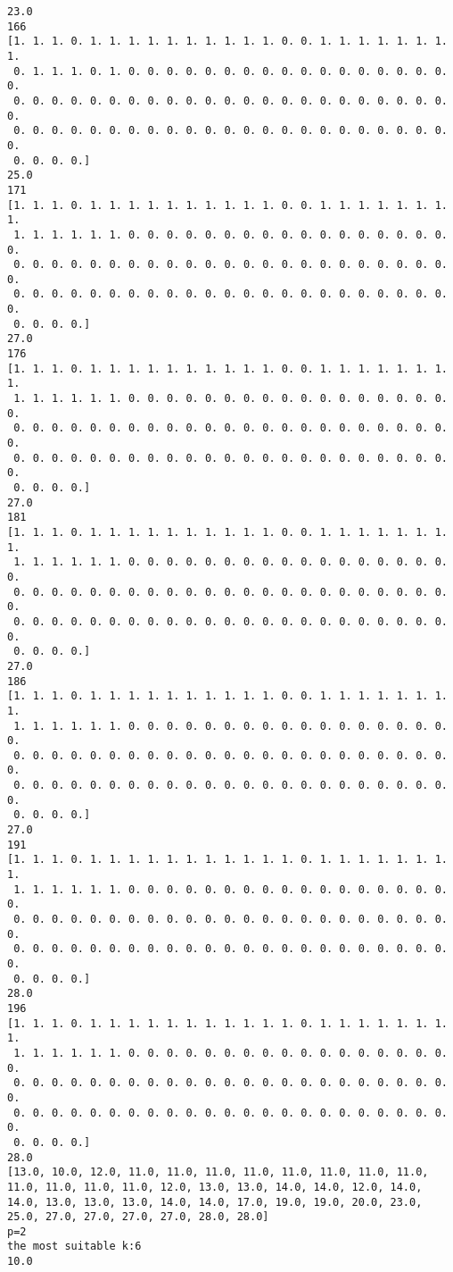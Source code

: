 \documentclass[11pt]{article}
\begin{document}
\begin{Verbatim}[commandchars=\\\{\}]
23.0
166
[1. 1. 1. 0. 1. 1. 1. 1. 1. 1. 1. 1. 1. 1. 0. 0. 1. 1. 1. 1. 1. 1. 1. 1.
 0. 1. 1. 1. 0. 1. 0. 0. 0. 0. 0. 0. 0. 0. 0. 0. 0. 0. 0. 0. 0. 0. 0. 0.
 0. 0. 0. 0. 0. 0. 0. 0. 0. 0. 0. 0. 0. 0. 0. 0. 0. 0. 0. 0. 0. 0. 0. 0.
 0. 0. 0. 0. 0. 0. 0. 0. 0. 0. 0. 0. 0. 0. 0. 0. 0. 0. 0. 0. 0. 0. 0. 0.
 0. 0. 0. 0.]
25.0
171
[1. 1. 1. 0. 1. 1. 1. 1. 1. 1. 1. 1. 1. 1. 0. 0. 1. 1. 1. 1. 1. 1. 1. 1.
 1. 1. 1. 1. 1. 1. 0. 0. 0. 0. 0. 0. 0. 0. 0. 0. 0. 0. 0. 0. 0. 0. 0. 0.
 0. 0. 0. 0. 0. 0. 0. 0. 0. 0. 0. 0. 0. 0. 0. 0. 0. 0. 0. 0. 0. 0. 0. 0.
 0. 0. 0. 0. 0. 0. 0. 0. 0. 0. 0. 0. 0. 0. 0. 0. 0. 0. 0. 0. 0. 0. 0. 0.
 0. 0. 0. 0.]
27.0
176
[1. 1. 1. 0. 1. 1. 1. 1. 1. 1. 1. 1. 1. 1. 0. 0. 1. 1. 1. 1. 1. 1. 1. 1.
 1. 1. 1. 1. 1. 1. 0. 0. 0. 0. 0. 0. 0. 0. 0. 0. 0. 0. 0. 0. 0. 0. 0. 0.
 0. 0. 0. 0. 0. 0. 0. 0. 0. 0. 0. 0. 0. 0. 0. 0. 0. 0. 0. 0. 0. 0. 0. 0.
 0. 0. 0. 0. 0. 0. 0. 0. 0. 0. 0. 0. 0. 0. 0. 0. 0. 0. 0. 0. 0. 0. 0. 0.
 0. 0. 0. 0.]
27.0
181
[1. 1. 1. 0. 1. 1. 1. 1. 1. 1. 1. 1. 1. 1. 0. 0. 1. 1. 1. 1. 1. 1. 1. 1.
 1. 1. 1. 1. 1. 1. 0. 0. 0. 0. 0. 0. 0. 0. 0. 0. 0. 0. 0. 0. 0. 0. 0. 0.
 0. 0. 0. 0. 0. 0. 0. 0. 0. 0. 0. 0. 0. 0. 0. 0. 0. 0. 0. 0. 0. 0. 0. 0.
 0. 0. 0. 0. 0. 0. 0. 0. 0. 0. 0. 0. 0. 0. 0. 0. 0. 0. 0. 0. 0. 0. 0. 0.
 0. 0. 0. 0.]
27.0
186
[1. 1. 1. 0. 1. 1. 1. 1. 1. 1. 1. 1. 1. 1. 0. 0. 1. 1. 1. 1. 1. 1. 1. 1.
 1. 1. 1. 1. 1. 1. 0. 0. 0. 0. 0. 0. 0. 0. 0. 0. 0. 0. 0. 0. 0. 0. 0. 0.
 0. 0. 0. 0. 0. 0. 0. 0. 0. 0. 0. 0. 0. 0. 0. 0. 0. 0. 0. 0. 0. 0. 0. 0.
 0. 0. 0. 0. 0. 0. 0. 0. 0. 0. 0. 0. 0. 0. 0. 0. 0. 0. 0. 0. 0. 0. 0. 0.
 0. 0. 0. 0.]
27.0
191
[1. 1. 1. 0. 1. 1. 1. 1. 1. 1. 1. 1. 1. 1. 1. 0. 1. 1. 1. 1. 1. 1. 1. 1.
 1. 1. 1. 1. 1. 1. 0. 0. 0. 0. 0. 0. 0. 0. 0. 0. 0. 0. 0. 0. 0. 0. 0. 0.
 0. 0. 0. 0. 0. 0. 0. 0. 0. 0. 0. 0. 0. 0. 0. 0. 0. 0. 0. 0. 0. 0. 0. 0.
 0. 0. 0. 0. 0. 0. 0. 0. 0. 0. 0. 0. 0. 0. 0. 0. 0. 0. 0. 0. 0. 0. 0. 0.
 0. 0. 0. 0.]
28.0
196
[1. 1. 1. 0. 1. 1. 1. 1. 1. 1. 1. 1. 1. 1. 1. 0. 1. 1. 1. 1. 1. 1. 1. 1.
 1. 1. 1. 1. 1. 1. 0. 0. 0. 0. 0. 0. 0. 0. 0. 0. 0. 0. 0. 0. 0. 0. 0. 0.
 0. 0. 0. 0. 0. 0. 0. 0. 0. 0. 0. 0. 0. 0. 0. 0. 0. 0. 0. 0. 0. 0. 0. 0.
 0. 0. 0. 0. 0. 0. 0. 0. 0. 0. 0. 0. 0. 0. 0. 0. 0. 0. 0. 0. 0. 0. 0. 0.
 0. 0. 0. 0.]
28.0
[13.0, 10.0, 12.0, 11.0, 11.0, 11.0, 11.0, 11.0, 11.0, 11.0, 11.0, 11.0, 11.0, 11.0, 11.0, 12.0, 13.0, 13.0, 14.0, 14.0, 12.0, 14.0, 14.0, 13.0, 13.0, 13.0, 14.0, 14.0, 17.0, 19.0, 19.0, 20.0, 23.0, 25.0, 27.0, 27.0, 27.0, 27.0, 28.0, 28.0]
p=2
the most suitable k:6
10.0

    \end{Verbatim}
\end{document}
